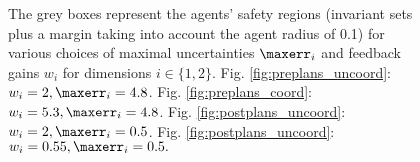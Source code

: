  \begin{figure}
        \centering
       \caption{The grey boxes represent the agents' safety regions (invariant sets plus a margin taking into account the agent radius of 0.1) for various choices of maximal uncertainties $\maxerr_i$ and feedback gains $w_i$ for dimensions $i \in \{1,2\}$. Fig. \ref{fig:preplans_uncoord}: $w_i=2, \maxerr_i = 4.8$. Fig. \ref{fig:preplans_coord}: $w_i=5.3, \maxerr_i = 4.8$. Fig. \ref{fig:postplans_uncoord}: $w_i=2, \maxerr_i = 0.5$. Fig. \ref{fig:postplans_uncoord}: $w_i=0.55, \maxerr_i = 0.5.$}
\label{fig:coordlearningagentsplansKIvel}
\end{figure}	  

